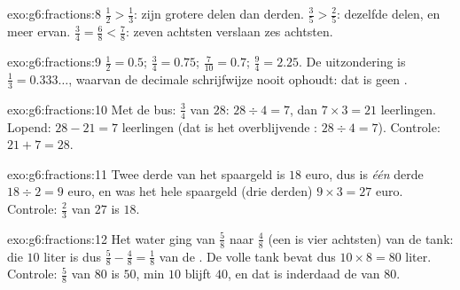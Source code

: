 \begin{solution}{exo:g6:fractions:8}
$\frac12 > \frac13$:  zijn grotere delen dan derden.
$\frac35 > \frac25$: dezelfde delen, en meer ervan.
$\frac34 = \frac68 < \frac78$: zeven achtsten verslaan zes achtsten.
\end{solution}

\begin{solution}{exo:g6:fractions:9}
$\frac12 = 0.5$; \quad $\frac34 = 0.75$; \quad $\frac{7}{10} = 0.7$; \quad
$\frac94 = 2.25$. De uitzondering is $\frac13 = 0.333\dots$, waarvan de
decimale schrijfwijze nooit ophoudt: dat is geen .
\end{solution}

\begin{solution}{exo:g6:fractions:10}
Met de bus: $\frac34$ van $28$: $28 \div 4 = 7$, dan $7 \times 3 = 21$
leerlingen. Lopend: $28 - 21 = 7$ leerlingen (dat is het overblijvende :
$28 \div 4 = 7$). Controle: $21 + 7 = 28$.
\end{solution}

\begin{solution}{exo:g6:fractions:11}
Twee derde van het spaargeld is $18$ euro, dus is \emph{één} derde
$18 \div 2 = 9$ euro, en was het hele spaargeld (drie derden)
$9 \times 3 = 27$ euro. Controle: $\frac23$ van $27$ is $18$.
\end{solution}

\begin{solution}{exo:g6:fractions:12}
Het water ging van $\frac58$ naar $\frac48$ (een  is vier achtsten) van de
tank: die $10$ liter is dus $\frac58 - \frac48 = \frac18$ van de . De
volle tank bevat dus $10 \times 8 = 80$ liter. Controle: $\frac58$ van $80$ is
$50$, min $10$ blijft $40$, en dat is inderdaad de  van $80$.
\end{solution}

